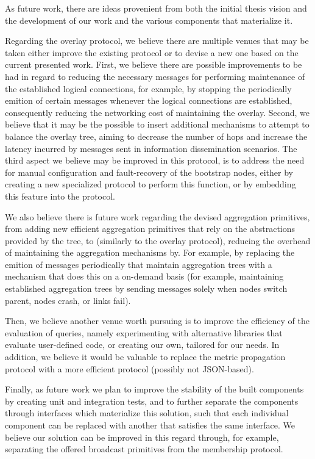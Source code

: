 As future work, there are ideas provenient from both the initial thesis vision and the development of our work and the various components that materialize it. 

Regarding the overlay protocol, we believe there are multiple venues that may be taken either improve the existing protocol or to devise a new one based on the current presented work. First, we believe there are possible improvements to be had in regard to reducing the necessary messages for performing maintenance of the established logical connections, for example, by stopping the periodically emition of certain messages whenever the logical connections are established, consequently reducing the networking cost of maintaining the overlay. Second, we believe that it may be the possible to insert additional mechanisms to attempt to balance the overlay tree, aiming to decrease the number of hops and increase the latency incurred by messages sent in information dissemination scenarios. The third aspect we believe may be improved in this protocol, is to address the need for manual configuration and fault-recovery of the bootstrap nodes, either by creating a new specialized protocol to perform this function, or by embedding this feature into the protocol.

We also believe there is future work regarding the devised aggregation primitives, from adding new efficient aggregation primitives that rely on the abstractions provided by the tree, to (similarly to the overlay protocol), reducing the overhead of maintaining the aggregation mechanisms by. For example, by replacing the emition of messages periodically that maintain aggregation trees with a mechanism that does this on a on-demand basis (for example, maintaining established aggregation trees by sending messages solely when nodes switch parent, nodes crash, or links fail).

Then, we believe another venue worth pursuing is to improve the efficiency of the evaluation of queries, namely experimenting with alternative libraries that evaluate user-defined code, or creating our own, tailored for our needs. In addition, we believe it would be valuable to replace the metric propagation protocol with a more efficient protocol (possibly not JSON-based).

Finally, as future work we plan to improve the stability of the built components by creating unit and integration tests, and to further separate the components through interfaces which materialize this solution, such that each individual component can be replaced with another that satisfies the same interface. We believe our solution can be improved in this regard through, for example, separating the offered broadcast primitives from the membership protocol. 